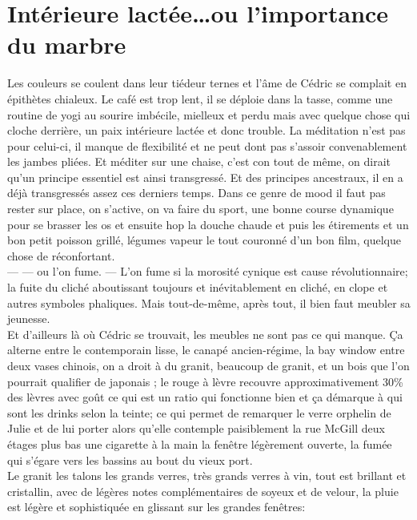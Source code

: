 
 \section*{ Intérieure lactée\ldots ou l'importance du marbre} Les couleurs se coulent dans leur tiédeur ternes et
l'âme de Cédric se complait en épithètes chialeux. Le café est trop lent, il se
déploie dans la tasse, comme une routine de yogi au sourire imbécile, mielleux
et perdu mais avec quelque chose qui cloche derrière, un paix intérieure lactée
et donc trouble. La méditation n'est pas pour celui-ci, il manque de flexibilité
et ne peut dont pas s'assoir convenablement les jambes pliées.  Et méditer sur
une chaise, c'est con tout de même, on dirait qu'un principe essentiel est ainsi
transgressé. Et des principes ancestraux, il en a déjà transgressés assez ces
derniers temps.  Dans ce genre de mood il faut pas rester sur place, on
s'active, on va faire du sport, une bonne course dynamique pour se brasser les
os et ensuite hop la douche chaude et puis les étirements et un bon petit
poisson grillé, légumes vapeur le tout couronné d'un bon film, quelque chose de
réconfortant.  \\--- --- ou l'on fume. --- L'on fume si la morosité cynique est
cause révolutionnaire; la fuite du cliché aboutissant toujours et
inévitablement en cliché, en  clope et autres symboles phaliques.  Mais
tout-de-même, après tout, il bien faut meubler sa jeunesse. \\

Et d'ailleurs là où Cédric se trouvait, les meubles ne sont pas ce qui manque.
Ça alterne entre le contemporain lisse, le canapé ancien-régime, la bay window
entre deux vases chinois, on a droit à du granit, beaucoup de granit, et un bois
que l'on pourrait qualifier de japonais ; le rouge à lèvre recouvre
approximativement 30\% des lèvres avec goût ce qui est un ratio qui fonctionne
bien et ça démarque à qui sont les drinks selon la teinte; ce qui permet de
remarquer le verre orphelin de Julie et de lui porter alors qu'elle contemple
paisiblement la rue McGill deux étages plus bas une cigarette à la main la
fenêtre légèrement ouverte, la fumée qui s'égare vers les bassins au bout du vieux port. 
\\Le granit les talons les grands verres, très grands verres à vin, tout est
brillant et cristallin, avec de légères notes complémentaires de soyeux et de
velour, la pluie est légère et sophistiquée en glissant sur les grandes
fenêtres:

